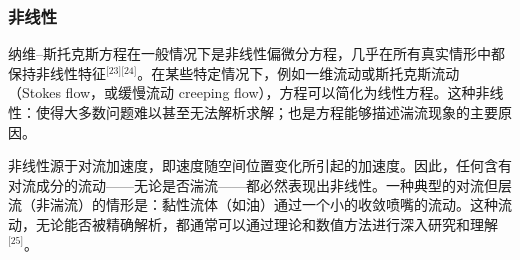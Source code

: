 \subsubsection{非线性}
纳维–斯托克斯方程在一般情况下是非线性偏微分方程，几乎在所有真实情形中都保持非线性特征\(^\text{[23][24]}\)。在某些特定情况下，例如一维流动或斯托克斯流动（Stokes flow，或缓慢流动 creeping flow），方程可以简化为线性方程。这种非线性：使得大多数问题难以甚至无法解析求解；也是方程能够描述湍流现象的主要原因。

非线性源于对流加速度，即速度随空间位置变化所引起的加速度。因此，任何含有对流成分的流动——无论是否湍流——都必然表现出非线性。一种典型的对流但层流（非湍流）的情形是：黏性流体（如油）通过一个小的收敛喷嘴的流动。这种流动，无论能否被精确解析，都通常可以通过理论和数值方法进行深入研究和理解\(^\text{[25]}\)。
